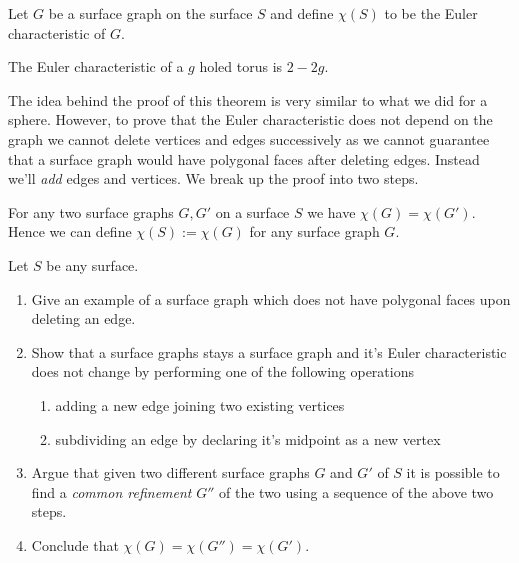 Let $G$ be a surface graph on the surface $S$ and define $\chi(S)$ to be the Euler characteristic of $G$.
\begin{mdframed}
	\begin{thm}
		\label{thm:Euler}
		The Euler characteristic of a $g$ holed torus is $2 - 2g$.\\
	\end{thm}
\end{mdframed}
The idea behind the proof of this theorem is very similar to what we did for a sphere. However, to prove that the Euler characteristic does not depend on the graph we cannot delete vertices and edges successively as we cannot guarantee that a surface graph would have polygonal faces after deleting edges. Instead we'll \textit{add} edges and vertices. We break up the proof into two steps.


\begin{lem}\label{thm:Euler_thm_surface}
	For any two surface graphs $G,G'$ on a surface $S$ we have $\chi(G)=\chi(G')$. Hence we can define $\chi(S):=\chi(G)$ for any surface graph $G$.
\end{lem}

\begin{exercise}\label{thm:proof_euler_char_1}
	Let $ S $ be any surface.
	\begin{enumerate}
		\item Give an example of a surface graph which does not have polygonal faces upon deleting an edge.
		\item Show that a surface graphs stays a surface graph and it's Euler characteristic does not change by performing one of the following operations
		      \begin{enumerate}[label=\alph*)]
		      	\item adding a new edge joining two existing vertices
		      	\item subdividing an edge by declaring it's midpoint as a new vertex
		      \end{enumerate}
		\item Argue that given two different surface graphs $ G $ and $ G' $ of  $ S $ it is possible to find a  \emph{common refinement} $ G'' $ of the two using a sequence of the above two steps.
		\item Conclude that $ \chi(G) = \chi(G'') = \chi(G') $.
	\end{enumerate}
\end{exercise}

